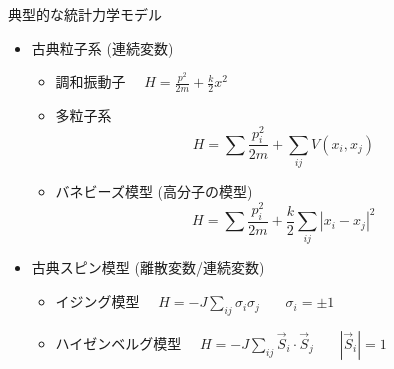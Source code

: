 
\begin{frame}[t,fragile]{典型的な統計力学モデル}
  \begin{itemize}
  \item 古典粒子系 (連続変数)
    \begin{itemize}
    \item 調和振動子 \ \ $\displaystyle H = \frac{p^2}{2m} + \frac{k}{2}x^2$
    \item 多粒子系
      \[
      H = \sum \frac{p_i^2}{2m} + \sum_{ij} V(x_i, x_j)
      \]
    \item バネビーズ模型 (高分子の模型)
      \[
      H = \sum \frac{p_i^2}{2m} + \frac{k}{2} \sum_{ij} |x_i-x_j|^2
      \]
  \end{itemize}
  \item 古典スピン模型 (離散変数/連続変数)
    \begin{itemize}
    \item イジング模型 \ \ $\displaystyle H = -J \sum_{ij} \sigma_i \sigma_j$ \ \ \ $\sigma_i = \pm 1$
    \item ハイゼンベルグ模型 \ \ $\displaystyle H = -J \sum_{ij} \vec{S}_i \cdot \vec{S}_j$ \ \ \ $|\vec{S}_i| = 1$
    \end{itemize}
  \end{itemize}
\end{frame}
